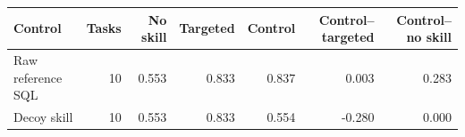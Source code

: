 \begin{tabular}{lrrrrrr}
\toprule
Control & Tasks & No skill & Targeted & Control & Control--targeted & Control--no skill \\
\midrule
Raw reference SQL & 10 & 0.553 & 0.833 & 0.837 & 0.003 & 0.283 \\
Decoy skill & 10 & 0.553 & 0.833 & 0.554 & -0.280 & 0.000 \\
\bottomrule
\end{tabular}
